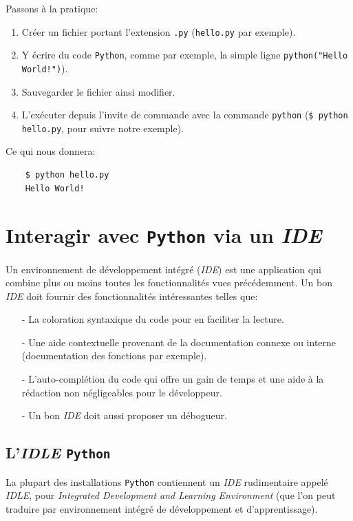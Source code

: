 Passons à la pratique:
\begin{enumerate}
	\item Créer un fichier portant l'extension \texttt{.py} (\texttt{hello.py} par exemple).
	\item Y écrire du code \texttt{Python}, comme par exemple, la simple ligne \texttt{python("Hello World!")}).
	\item Sauvegarder le fichier ainsi modifier.
	\item L'exécuter depuis l'invite de commande avec la commande \texttt{python} (\verb|$ python hello.py|, pour suivre notre exemple).
\end{enumerate}
\medskip

Ce qui nous donnera:
\begin{verbatim}
    $ python hello.py
    Hello World!
\end{verbatim}

\section{Interagir avec \texttt{Python} via un \textit{IDE}}
Un environnement de développement intégré (\textit{IDE}) est une application qui combine plus ou moins toutes les fonctionnalités vues précédemment. Un bon \textit{IDE} doit fournir des fonctionnalités intéressantes telles que:
\begin{itemize}
	\item[-] La coloration syntaxique du code pour en faciliter la lecture.
	\item[-] Une aide contextuelle provenant de la documentation connexe ou interne (documentation des fonctions par exemple).
	\item[-] L'auto-complétion du code qui offre un gain de temps et une aide à la rédaction non négligeables pour le développeur.
	\item[-] Un bon \textit{IDE} doit aussi proposer un débogueur.
\end{itemize}
\medskip

\subsection*{L'\textit{IDLE} \texttt{Python}}
La plupart des installations \texttt{Python} contiennent un \textit{IDE} rudimentaire appelé \textit{IDLE}, pour \og \textit{Integrated Development and Learning Environment}\fg{} (que l'on peut traduire par \og environnement intégré de développement et d'apprentissage\fg{}).
\medskip

